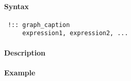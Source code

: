 


	\paragraph{Syntax}
 
 \begin{verbatim}
 !:: graph_caption
     expression1, expression2, ...
 \end{verbatim}
 
 \paragraph{Description}
 
 \paragraph{Example}


